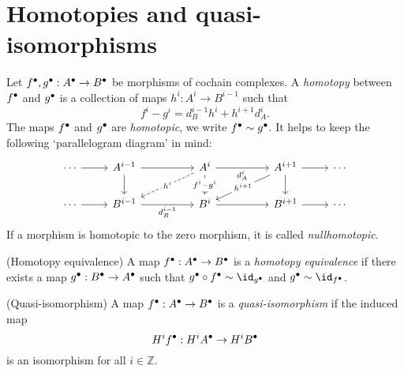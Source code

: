 \section{Homotopies and quasi-isomorphisms}
\begin{defn}
Let ${f}^\bullet, {g}^\bullet: {A}^\bullet \to {B}^\bullet$ be morphisms of cochain complexes. A \emph{homotopy} between ${f}^\bullet$ and ${g}^\bullet$ is a collection of maps $h^i: A^i \to B^{i-1}$ such that \[
	f^i - g^i = d^{i-1}_B h^i + h^{i+1}d^i_A.
\]
The maps ${f}^\bullet$ and ${g}^\bullet$ are \emph{homotopic}, we write ${f}^\bullet \sim {g}^\bullet$. It helps to keep the following `parallelogram diagram' in mind: 
\[\begin{tikzcd}
	{\cdots } & {A^{i-1}} && {A^i} && {A^{i+1}} & \cdots \\
	\cdots & {B^{i-1}} && {B^{i}} && {B^{i+1}} & \cdots
	\arrow[from=1-1, to=1-2]
	\arrow[from=1-2, to=1-4]
	\arrow[from=1-2, to=2-2]
	\arrow["{d^i_A}"', from=1-4, to=1-6]
	\arrow["{h^i}"{description}, dashed, from=1-4, to=2-2]
	\arrow["{f^i - g^i}"{description}, from=1-4, to=2-4]
	\arrow[from=1-6, to=1-7]
	\arrow["{h^{i+1}}"{description}, from=1-6, to=2-4]
	\arrow[from=1-6, to=2-6]
	\arrow[from=2-1, to=2-2]
	\arrow["{d^{i-1}_B}"', from=2-2, to=2-4]
	\arrow[from=2-4, to=2-6]
	\arrow[from=2-6, to=2-7]
\end{tikzcd}\]
If a morphism is homotopic to the zero morphism, it is called \emph{nullhomotopic}.
\end{defn}

\begin{defn}(Homotopy equivalence)
	A map ${f}^\bullet: {A}^\bullet \to {B}^\bullet$ is a \emph{homotopy equivalence} if there exists a map ${g}^\bullet: {B}^\bullet \to {A}^\bullet$ such that $\cochaincomplex{g} \circ \cochaincomplex{f} \sim \id_{\cochaincomplex{g}}$ and $\cochaincomplex{g} \sim \id_{\cochaincomplex{f}}$. 
\end{defn}

\begin{defn}(Quasi-isomorphism)
	A map ${f}^\bullet: {A}^\bullet \to {B}^\bullet$ is a \emph{quasi-isomorphism} if the induced map \[
    	\cohomology^i{\cochaincomplex{f}}: \cohomology^i{\cochaincomplex{A}} \to \cohomology^i{\cochaincomplex{B}}
    \] is an isomorphism for all $i \in \mathbb{Z}$. 
\end{defn}

